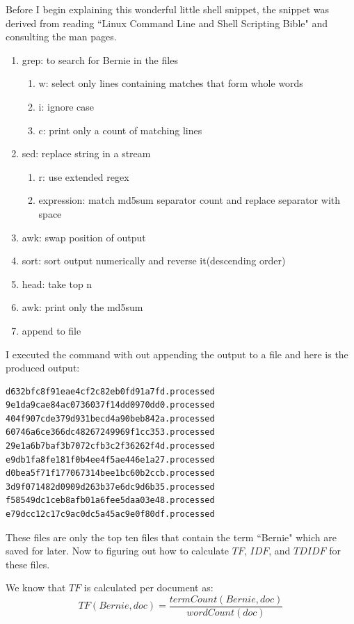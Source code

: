 \documentclass[letterpaper,10pt]{article}
\begin{document}
Before I begin explaining this wonderful little shell snippet, the snippet was derived from reading ``Linux Command Line and Shell Scripting Bible" \cite{linuxBible} and consulting the man pages.

\begin{enumerate}
\item grep: to search for Bernie in the files
\begin{enumerate}
\item w: select only lines containing matches that form whole words
\item i: ignore case
\item c: print only a count of matching lines
\end{enumerate}
\item sed: replace string in a stream
\begin{enumerate}
\item r: use extended regex
\item expression: match md5sum separator count and replace separator with space
\end{enumerate}
\item awk: swap position of output
\item sort: sort output numerically and reverse it(descending order)
\item head: take top n
\item awk: print only the md5sum
\item append to file 
\end{enumerate}


I executed the command with out appending the output to a file and here is the produced output:
\begin{lstlisting}[frame=single]
d632bfc8f91eae4cf2c82eb0fd91a7fd.processed
9e1da9cae84ac0736037f14dd0970dd0.processed
404f907cde379d931becd4a90beb842a.processed
60746a6ce366dc48267249969f1cc353.processed
29e1a6b7baf3b7072cfb3c2f36262f4d.processed
e9db1fa8fe181f0b4ee4f5ae446e1a27.processed
d0bea5f71f177067314bee1bc60b2ccb.processed
3d9f071482d0909d263b37e6dc9d6b35.processed
f58549dc1ceb8afb01a6fee5daa03e48.processed
e79dcc12c17c9ac0dc5a45ac9e0f80df.processed
\end{lstlisting}

These files are only the top ten files that contain the term ``Bernie" which are saved for later. Now to figuring out how to calculate \(TF\), \(IDF\), and \(TDIDF\) for these files.


We know that \(TF\) is calculated per document as: \[ TF(Bernie,doc)= \frac{termCount(Bernie,doc)}{wordCount(doc)} \]
\end{document}
